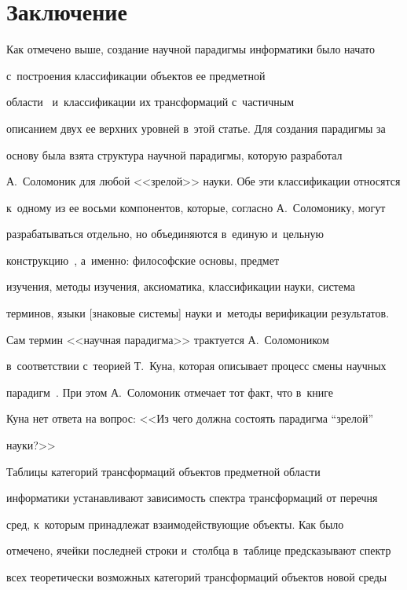 \section{Заключение}



  Как отмечено выше, создание научной парадигмы информатики было начато 

с~построения классификации объектов ее предметной  

об\-ласти~\cite{7-zac, 10-zac} и~классификации их трансформаций с~частичным 

описанием двух ее верхних уровней в~этой статье. Для создания парадигмы за 

основу была взята структура научной парадигмы, которую разработал 

А.~Соломоник для любой <<зрелой>> науки. Обе эти классификации относятся 

к~одному из ее восьми компонентов, которые, согласно А.~Соломонику, могут 

разрабатываться отдельно, но объединяются в~единую и~цельную 

конструкцию~\cite{15-zac, 16-zac}, а~именно: философские основы, предмет 

изуче\-ния, методы изуче\-ния, аксиоматика, классификации науки, сис\-те\-ма 

терминов, языки [знаковые сис\-те\-мы] науки и~методы верификации результатов. 

Сам тер\-мин <<научная парадигма>> трактуется А.~Соломоником 

в~соответствии с~тео\-ри\-ей Т.~Куна, которая описывает процесс смены научных 

парадигм~\cite{19-zac}. При этом А.~Соломоник отмечает тот факт, что в~книге 

Куна нет ответа на вопрос: <<Из чего долж\-на со\-сто\-ять парадигма ``зрелой'' 

науки?>>

  

  Таблицы категорий трансформаций объектов предметной области 

информатики устанавливают зависимость спектра трансформаций от перечня 

сред, к~которым принадлежат взаимодействующие объекты. Как было 

отмечено, ячейки последней строки и~столбца в~таблице предсказывают спектр 

всех теоретически возможных категорий трансформаций объектов новой среды 

